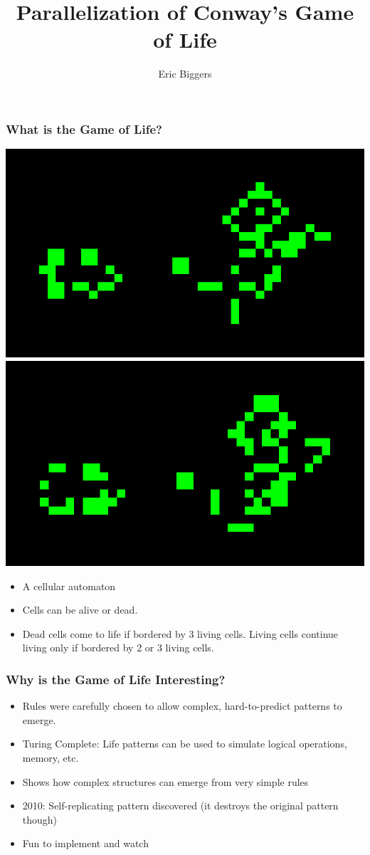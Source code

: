 \documentclass{beamer}
\begin{document}
\title{Parallelization of Conway's Game of Life}
\author{Eric Biggers}

\frame{\titlepage}

\begin{frame}
	\frametitle{What is the Game of Life?}
		\includegraphics[scale=0.25]{life1-cropped.png}
		\hspace{3mm}
		\includegraphics[scale=0.25]{life2-cropped.png}
	\begin{itemize}
		\item A cellular automaton
		\item Cells can be alive or dead.
		\item Dead cells come to life if bordered by 3 living cells.  Living cells
		continue living only if bordered by 2 or 3 living cells.
	\end{itemize}
\end{frame}

\begin{frame}
	\frametitle{Why is the Game of Life Interesting?}
	\begin{itemize}
		\item Rules were carefully chosen to allow complex, hard-to-predict
		patterns to emerge.
		\item Turing Complete: Life patterns can be used to simulate
		logical operations, memory, etc.
		\item Shows how complex structures can emerge from very simple
		rules
		\item 2010: Self-replicating pattern discovered (it destroys the
		original pattern though)
		\item Fun to implement and watch
	\end{itemize}
\end{frame}
\end{document}
